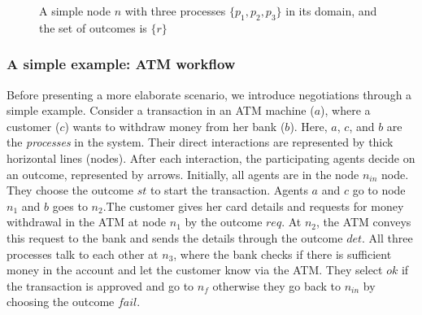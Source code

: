 \begin{figure}[t]
\centering
{}
\caption{A simple node $n$ with three processes $\{p_1, p_2, p_3\}$ in its domain, and the set of outcomes is $\{r\}$}
\label{fig:node}
\end{figure}

\subsubsection{A simple example: ATM workflow}
\label{example:ATM-untimed}

Before presenting a more elaborate scenario, we introduce negotiations through a simple example. Consider a transaction in an ATM machine ($a$), where a customer ($c$) wants to withdraw money from her bank ($b$).  Here, $a$, $c$, and $b$ are the \emph{processes} in the system. Their direct interactions are represented by thick horizontal lines (nodes). After each interaction, the participating agents decide on an outcome, represented by arrows. Initially, all agents are in the node $n_{in}$ node. They choose the outcome $st$ to start the transaction. Agents $a$ and $c$ go to node $n_1$ and $b$ goes to $n_2$.The customer gives her card details and requests for money withdrawal in the ATM at node $n_1$ by the outcome $req$. At $n_2$, the ATM conveys this request to the bank and sends the details through the outcome $det$. All three processes talk to each other at $n_3$, where the bank checks if there is sufficient money in the account and let the customer know via the ATM. They select $ok$ if the transaction is approved and go to $n_f$ otherwise they go back to $n_{in}$ by choosing the outcome $fail$.

